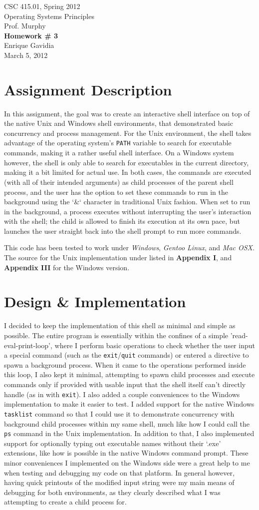 \documentclass[12pt]{article}
\def \name       {Enrique Gavidia}
\def \coursenum  {CSC 415.01}
\def \coursename {Operating Systems Principles}
\def \instructor {Prof. Murphy}
\def \semester   {Spring 2012}
\def \assignment {Homework \# 3}
\def \duedate    {March 5, 2012}
\newcommand {\makecover} {
  \begin{titlepage}
    \begin{center}
      \LARGE{\coursenum, \semester \\ \coursename}\\
      \Large{\instructor}\\
      \vfill
      \textbf{\Huge \assignment}\\
      \vfill
      \Large{\name}\\
      \large{\duedate}
    \end{center}
  \end{titlepage}
}
\begin{document}
\makecover

\section*{Assignment Description}
In this assignment, the goal was to create an interactive shell interface on top of the native Unix and Windows shell environments, that
demonstrated basic concurrency and process management. For the Unix environment, the shell takes advantage of the operating system's
\texttt{PATH} variable to search for executable commands, making it a rather useful shell interface. On a Windows system however, the shell
is only able to search for executables in the current directory, making it a bit limited for actual use. In both cases, the commands are
executed (with all of their intended arguments) as child processes of the parent shell process, and the user has the option to set these commands
to run in the background using the `\&` character in traditional Unix fashion. When set to run in the background, a process executes without
interrupting the user's interaction with the shell; the child is allowed to finish its execution at its own pace, but launches the user straight
back into the shell prompt to run more commands.

This code has been tested to work under \textsl{Windows}, \textsl{Gentoo Linux}, and \textsl{Mac OSX}.
The source for the Unix implementation under listed in \textbf{Appendix I}, and \textbf{Appendix III} for the Windows version.

\section*{Design \& Implementation}
I decided to keep the implementation of this shell as minimal and simple as possible. The entire program is essentially within the
confines of a simple 'read-eval-print-loop', where I perform basic operations to check whether the user input a special command (such as the
\texttt{exit}/\texttt{quit} commands) or entered a directive to spawn a background process. When it came to the operations performed inside
this loop, I also kept it minimal, attempting to spawn child processes and execute commands only if provided with usable input that the shell itself
can't directly handle (as in with \texttt{exit}). I also added a couple conveniences to the Windows implementation to make it easier to test. I added
support for the native Windows \texttt{tasklist} command so that I could use it to demonstrate concurrency with background child processes within my
same shell, much like how I could call the \texttt{ps} command in the Unix implementation. In addition to that, I also implemented support for optionally
typing out executable names without their `.exe' extensions, like how is possible in the native Windows command prompt.
These minor conveniences I implemented on the Windows side were a great help to me when testing and debugging my code on that platform. In general however,
having quick printouts of the modified input string were my main means of debugging for both environments, as they clearly described what I was attempting
to create a child process for.
\end{document}

